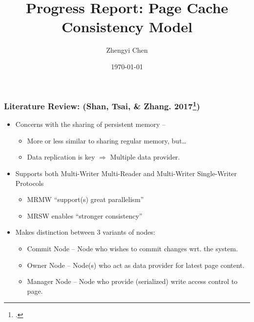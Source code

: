 \documentclass{beamer}
\title{Progress Report: Page Cache Consistency Model}
\author{Zhengyi Chen}
\date{\today}
\begin{document}
\frame{\titlepage}

\begin{frame}
    \frametitle{
        Literature Review: (Shan, Tsai, \& Zhang. 2017\footcite{shan2017distributed})
    }
    \begin{itemize}
        \item {
            Concerns with the sharing of persistent memory --
            \begin{itemize}
                \item More or less similar to sharing regular memory, but\dots
                \item Data replication is key $\Rightarrow$ Multiple data provider.
            \end{itemize}
        }
        \item {
            Supports both Multi-Writer Multi-Reader and Multi-Writer Single-Writer Protocols
            \begin{itemize}
                \item MRMW ``support(s) great parallelism''
                \item MRSW enables ``stronger consistency''
            \end{itemize}
        }
        \item {
            Makes distinction between 3 variants of nodes:
            \begin{itemize}
                \item Commit Node -- Node who wishes to commit changes wrt. the system.
                \item Owner Node -- Node(s) who act as data provider for latest page content.
                \item Manager Node -- Node who provide (serialized) write access control to page.
            \end{itemize}
        }
    \end{itemize}
\end{frame}
\end{document}

